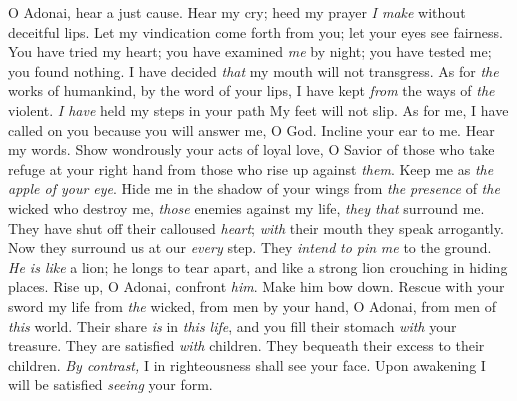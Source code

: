 \begin{biblechapter} %
 O Adonai, hear a just cause. 
Hear my cry; heed my prayer 
\textit{I make} without deceitful lips.
\verse Let my vindication come forth from you; 
let your eyes see fairness.
\verse You have tried my heart; 
you have examined \textit{me} by night; 
you have tested me; you found nothing. 
I have decided \textit{that} my mouth will not transgress.
\verse As for \textit{the} works of humankind, 
by the word of your lips, 
I have kept \textit{from} the ways of \textit{the} violent.
\verse \textit{I have} held my steps in your path 
My feet will not slip.
\verse As for me, I have called on you 
because you will answer me, O God. 
Incline your ear to me. 
Hear my words.
\verse Show wondrously your acts of loyal love, 
O Savior of those who take refuge 
at your right hand 
from those who rise up against \textit{them}.
\verse Keep me as \textit{the apple of your eye}. 
Hide me in the shadow of your wings
\verse from \textit{the} \textit{presence} of \textit{the} wicked who destroy me, 
\textit{those} enemies against my life, 
\textit{they that} surround me.
\verse They have shut off their calloused \textit{heart}; 
\textit{with} their mouth they speak arrogantly.
\verse Now they surround us at our \textit{every} step. 
They \textit{intend} 
\textit{to pin} \textit{me} to the ground.
\verse \textit{He is like} a lion; he longs to tear apart, 
and like a strong lion crouching in hiding places.
\verse Rise up, O Adonai, confront \textit{him}. 
Make him bow down. 
Rescue with your sword my life from \textit{the} wicked,
\verse from men by your hand, O Adonai, from men of \textit{this} world. 
Their share \textit{is} in \textit{this life}, and you fill their stomach \textit{with} your treasure. 
They are satisfied \textit{with} children. 
They bequeath their excess to their children.
\verse \textit{By contrast,} I in righteousness shall see your face. 
Upon awakening I will be satisfied \textit{seeing} your form.
\end{biblechapter}

